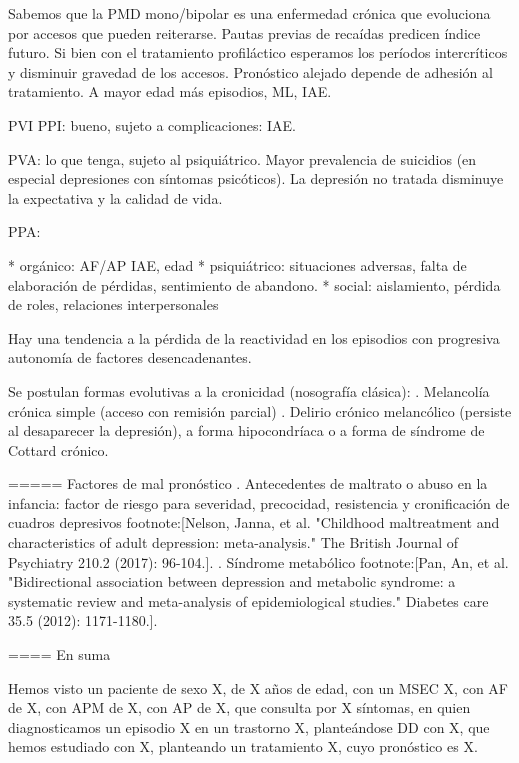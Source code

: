 Sabemos que la PMD mono/bipolar es una enfermedad crónica que evoluciona por accesos que pueden reiterarse. Pautas previas de recaídas predicen índice futuro. Si bien con el tratamiento profiláctico esperamos los períodos intercríticos y disminuir gravedad de los accesos. Pronóstico alejado depende de adhesión al tratamiento. A mayor edad más episodios, ML, IAE.

PVI PPI: bueno, sujeto a complicaciones: IAE.

PVA: lo que tenga, sujeto al psiquiátrico. Mayor prevalencia de suicidios (en especial depresiones con síntomas psicóticos). La depresión no tratada disminuye la expectativa y la calidad de vida.

PPA:

* orgánico: AF/AP IAE, edad
* psiquiátrico: situaciones adversas, falta de elaboración de pérdidas, sentimiento de abandono.
* social: aislamiento, pérdida de roles, relaciones interpersonales

Hay una tendencia a la pérdida de la reactividad en los episodios con progresiva autonomía de factores desencadenantes.

Se postulan formas evolutivas a la cronicidad (nosografía clásica):
. Melancolía crónica simple (acceso con remisión parcial)
. Delirio crónico melancólico (persiste al desaparecer la depresión), a forma hipocondríaca o a forma de síndrome de Cottard crónico.

===== Factores de mal pronóstico
. Antecedentes de maltrato o abuso en la infancia: factor de riesgo para severidad, precocidad, resistencia y cronificación de cuadros depresivos footnote:[Nelson, Janna, et al. "Childhood maltreatment and characteristics of adult depression: meta-analysis." The British Journal of Psychiatry 210.2 (2017): 96-104.].
. Síndrome metabólico footnote:[Pan, An, et al. "Bidirectional association between depression and metabolic syndrome: a systematic review and meta-analysis of epidemiological studies." Diabetes care 35.5 (2012): 1171-1180.].

==== En suma

Hemos visto un paciente de sexo X, de X años de edad, con un MSEC X, con AF de X, con APM de X, con AP de X, que consulta por X síntomas, en quien diagnosticamos un episodio X en un trastorno X, planteándose DD con X, que hemos estudiado con X, planteando un tratamiento X, cuyo pronóstico es X.
